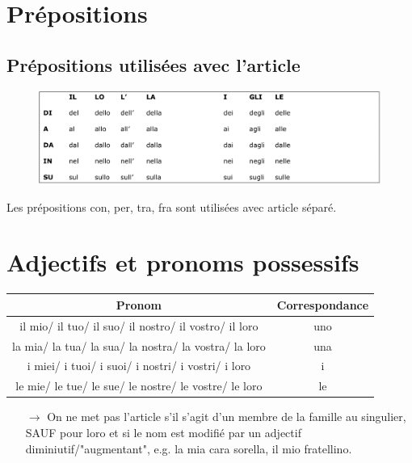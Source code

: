 \documentclass[12pt, openany]{report}
\begin{document}
\section{Prépositions}
\subsection{Prépositions utilisées avec l'article}
\begin{figure}[H]
    \centering
    \includegraphics[width = \textwidth]{img/prep.png}
\end{figure}
Les prépositions con, per, tra, fra sont utilisées avec article séparé. 
\section{Adjectifs et pronoms possessifs}
\begin{center}
    \begin{tabular}{c|c}
        Pronom & Correspondance\\ \hline
        il mio/ il tuo/ il suo/ il nostro/ il vostro/ il loro & uno \\
        la mia/ la tua/ la sua/ la nostra/ la vostra/ la loro & una\\
        i miei/ i tuoi/ i suoi/ i nostri/ i vostri/ i loro & i\\
        le mie/ le tue/ le sue/ le nostre/ le vostre/ le loro & le\\
    \end{tabular}
\end{center}
\begin{itemize}
    \item [$\rightarrow$] On ne met pas l'article s'il s'agit d'un membre de la famille au singulier, SAUF pour loro et si le nom est modifié par un adjectif diminiutif/"augmentant", e.g. la mia cara sorella, il mio fratellino.
\end{itemize}
\end{document}
